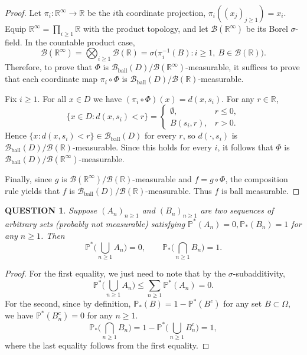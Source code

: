 \documentclass[12pt]{article}
\renewcommand{\(}{\left(}%
\renewcommand{\)}{\right)}%
\renewcommand{\[}{\left[}%
\renewcommand{\]}{\right]}%
\newcommand{\p}{\mathbb{P}}
\newtheorem{question}{QUESTION}[section]}
\newtheorem{proof}{Proof.}}
\begin{document}
\begin{proof}
Let $\pi_i:\mathbb R^\infty\to\mathbb R$ be the $i$th coordinate projection, $\pi_i((x_j)_{j\ge1})=x_i$. Equip $\mathbb R^\infty=\prod_{i\ge1}\mathbb R$ with the product topology, and let $\mathcal B(\mathbb R^\infty)$ be its Borel $\sigma$-field. In the countable product case,
\begin{equation*}
\mathcal B(\mathbb R^\infty)
=\bigotimes_{i\ge1}\mathcal B(\mathbb R)
=\sigma\big(\pi_i^{-1}(B): i\ge1,\ B\in\mathcal B(\mathbb R)\big).
\end{equation*}
Therefore, to prove that $\Phi$ is $\mathcal B_{\mathrm{ball}}(D)/\mathcal B(\mathbb R^\infty)$-measurable, it suffices to prove that each coordinate map $\pi_i\circ\Phi$ is $\mathcal B_{\mathrm{ball}}(D)/\mathcal B(\mathbb R)$-measurable.

Fix $i\ge1$. For all $x\in D$ we have $(\pi_i\circ\Phi)(x)=d(x,s_i)$. For any $r\in\mathbb R$,
\begin{equation*}
\{x\in D: d(x,s_i)<r\}
=
\begin{cases}
\emptyset, & r\le 0,\\
B(s_i,r), & r>0.
\end{cases}
\end{equation*}
Hence $\{x:d(x,s_i)<r\}\in\mathcal B_{\mathrm{ball}}(D)$ for every $r$, so $d(\cdot,s_i)$ is $\mathcal B_{\mathrm{ball}}(D)/\mathcal B(\mathbb R)$-measurable. Since this holds for every $i$, it follows that $\Phi$ is $\mathcal B_{\mathrm{ball}}(D)/\mathcal B(\mathbb R^\infty)$-measurable.

Finally, since $g$ is $\mathcal B(\mathbb R^\infty)/\mathcal B(\mathbb R)$-measurable and $f=g\circ\Phi$, the composition rule yields that $f$ is $\mathcal B_{\mathrm{ball}}(D)/\mathcal B(\mathbb R)$-measurable. Thus $f$ is ball measurable.
\end{proof}



\begin{question}
	Suppose $(A_n)_{n\geq 1}$ and $(B_n)_{n\geq 1}$ are two sequences of arbitrary sets (probably not measurable) satisfying $\p^*(A_n)=0,\p_*(B_n)=1$ for any $n\geq 1$. Then 
\begin{equation*}
	\p^*\Big(\bigcup_{n\geq1} A_n\Big)=0,\qquad \p_*\Big(\bigcap_{n\geq 1}B_n\Big)=1.
\end{equation*}
\end{question}

\begin{proof}
	For the first equality, we just need to note that by the $\sigma$-subadditivity,
\begin{equation*}
	\p^*\Big(\bigcup_{n\geq 1}A_n\Big)\leq \sum_{n\geq 1}\p^*(A_n)=0.
\end{equation*}
For the second, since by definition, $\p_*(B)=1-\p^*(B^c)$ for any set $B\subset \Omega$, we have $\p^*(B_n^c)=0$ for any $n\geq 1$.
\begin{equation*}
	\p_*\Big(\bigcap_{n\geq1} B_n\Big)=1-\p^*\Big(\bigcup_{n\geq1} B^c_n\Big)=1,
\end{equation*}
where the last equality follows from the first equality.
\end{proof}
\end{document}
